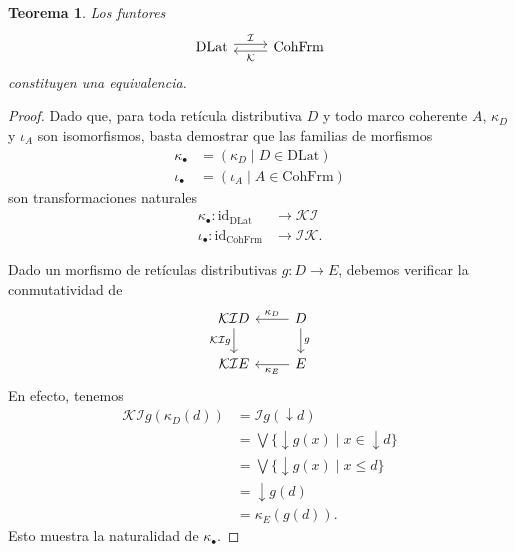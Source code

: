 \documentclass[12pt,letterpaper,titlepage]{article}
\newtheorem{thm}{Teorema}
\theoremstyle{definition}
\newcommand\Sup{\bigvee}
\newcommand\down{{\downarrow}}
\renewcommand\cal[1]{\mathcal{#1}}
\newcommand\<{\langle}
\renewcommand\>{\rangle}
\newcommand{\DLat}{\mathrm{DLat}}
\newcommand{\CohFrm}{\mathrm{CohFrm}}
\newcommand{\id}{\mathrm{id}}
\begin{document}
\begin{thm}
    Los funtores
    \[
        \begin{tikzcd}
            \DLat \ar[r,"\cal I",shift left] &
            \CohFrm \ar[l,"\cal K",shift left]
        \end{tikzcd}
    \]
    constituyen una equivalencia.
\end{thm}
\begin{proof}
    Dado que, para toda retícula distributiva $D$
    y todo marco coherente $A$,  $\kappa_D$ y $\iota_A$
    son isomorfismos, basta demostrar que las familias
    de morfismos
    \begin{align*}
        \kappa_\bullet &= (\kappa_D\mid D\in\DLat) \\
        \iota_\bullet &= (\iota_A\mid A\in\CohFrm)
    \end{align*}
    son transformaciones naturales
    \begin{align*}
        \kappa_\bullet:\id_\DLat &\to\cal K\cal I \\
        \iota_\bullet:\id_\CohFrm &\to\cal I\cal K.
    \end{align*}
    
    Dado un morfismo de retículas distributivas
    $g:D\to E$, debemos verificar la conmutatividad de
    \[
        \begin{tikzcd}
            \cal K\cal ID \ar[d,"\cal K\cal I g"']
                & D \ar[l,"\kappa_D"'] \ar[d,"g"] \\
            \cal K\cal IE
                & E \ar[l,"\kappa_E"]
        \end{tikzcd}
    \]
    En efecto, tenemos
    \begin{align*}
        \cal K\cal Ig(\kappa_D(d))
        &= \cal Ig(\down d) \\
        &= \Sup\{\down g(x)\mid x\in\down d\} \\
        &= \Sup\{\down g(x)\mid x\leq d\} \\
        &= \down g(d) \\
        &= \kappa_E(g(d)).
    \end{align*}
    Esto muestra la naturalidad de $\kappa_\bullet$.
    

\end{proof}
\end{document}
